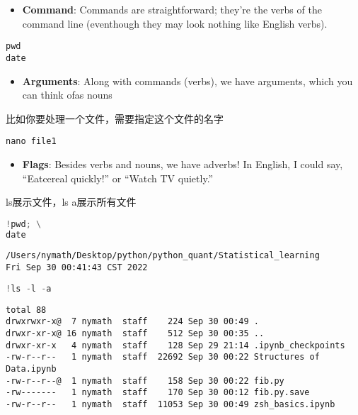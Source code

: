 \documentclass[
]{article}
\providecommand{\tightlist}{%
  \setlength{\itemsep}{0pt}\setlength{\parskip}{0pt}}
\begin{document}
\begin{itemize}
\tightlist
\item
  \textbf{Command}: Commands are straightforward; they're the verbs of
  the command line (eventhough they may look nothing like English
  verbs).
\end{itemize}

\begin{lstlisting}
pwd
date
\end{lstlisting}

\begin{itemize}
\tightlist
\item
  \textbf{Arguments}: Along with commands (verbs), we have arguments,
  which you can think ofas nouns
\end{itemize}

比如你要处理一个文件，需要指定这个文件的名字

\begin{lstlisting}
nano file1
\end{lstlisting}

\begin{itemize}
\tightlist
\item
  \textbf{Flags}: Besides verbs and nouns, we have adverbs! In English,
  I could say, ``Eatcereal quickly!'' or ``Watch TV quietly.''
\end{itemize}

ls展示文件，ls a展示所有文件

\hypertarget{4d64b54c}{}
\begin{lstlisting}[language=Python]
!pwd; \
date
\end{lstlisting}

\begin{lstlisting}
/Users/nymath/Desktop/python/python_quant/Statistical_learning
Fri Sep 30 00:41:43 CST 2022
\end{lstlisting}

\hypertarget{ecc4840a}{}
\begin{lstlisting}[language=Python]
!ls -l -a
\end{lstlisting}

\begin{lstlisting}
total 88
drwxrwxr-x@  7 nymath  staff    224 Sep 30 00:49 .
drwxr-xr-x@ 16 nymath  staff    512 Sep 30 00:35 ..
drwxr-xr-x   4 nymath  staff    128 Sep 29 21:14 .ipynb_checkpoints
-rw-r--r--   1 nymath  staff  22692 Sep 30 00:22 Structures of Data.ipynb
-rw-r--r--@  1 nymath  staff    158 Sep 30 00:22 fib.py
-rw-------   1 nymath  staff    170 Sep 30 00:12 fib.py.save
-rw-r--r--   1 nymath  staff  11053 Sep 30 00:49 zsh_basics.ipynb
\end{lstlisting}
\end{document}

